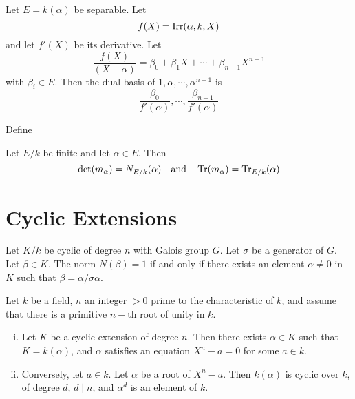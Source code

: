   \begin{prop}
    Let $E=k(\alpha)$ be separable. Let
    \begin{equation*}
      f(X)=\operatorname{Irr}(\alpha,k,X)
    \end{equation*}
    and let $f'(X)$ be its derivative. Let
    \begin{equation*}
      \frac{f(X)}{(X-\alpha)}=\beta_0+\beta_1X+\cdots+\beta_{n-1}X^{n-1}
    \end{equation*}
    with $\beta_i\in E$. Then the dual basis of $1,\alpha,\cdots,\alpha^{n-1}$ is
    \begin{equation*}
      \frac{\beta_0}{f'(\alpha)},\cdots,\frac{\beta_{n-1}}{f'(\alpha)}
    \end{equation*}
  \end{prop}

  Define

  \begin{prop}
    Let $E/k$ be finite and let $\alpha\in E$. Then
    \begin{equation*}
      \det(m_{\alpha})=N_{E/k}(\alpha)\quad\text{and}\quad\operatorname{Tr}(m_{\alpha})=\operatorname{Tr}_{E/k}(\alpha)
    \end{equation*}
  \end{prop}

\newpage\section{Cyclic Extensions}

  \begin{thm}
    Let $K/k$ be cyclic of degree $n$ with Galois group $G$. Let $\sigma$ be a generator of $G$. Let $\beta\in K$. The norm $N(\beta)=1$ if and only if there exists an element $\alpha\neq0$ in $K$ such that $\beta=\alpha/\sigma\alpha$.
  \end{thm}

  \begin{thm}
    Let $k$ be a field, $n$ an integer $>0$ prime to the characteristic of $k$, and assume that there is a primitive $n-$th root of unity in $k$.
    \begin{enumerate}[(i)]
      \item Let $K$ be a cyclic extension of degree $n$. Then there exists $\alpha\in K$ such that $K=k(\alpha)$, and $\alpha$ satisfies an equation $X^n-a=0$ for some $a\in k$.
      \item Conversely, let $a\in k$. Let $\alpha$ be a root of $X^n-a$. Then $k(\alpha)$ is cyclic over $k$, of degree $d$, $d\mid n$, and $\alpha^d$ is an element of $k$.
    \end{enumerate}
  \end{thm}

